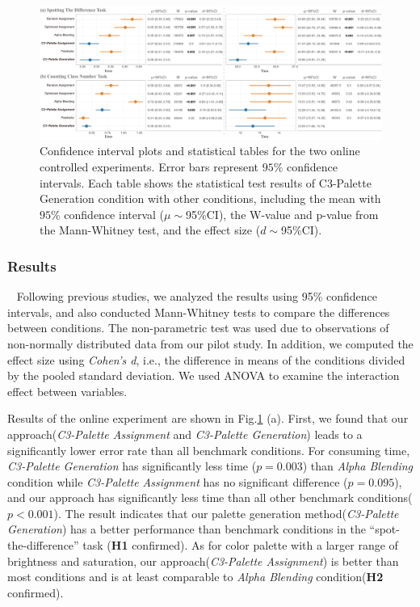 \begin{figure}[t]
\centering
\includegraphics[width=1\linewidth]{figures/user-result-formal.pdf}
\caption{Confidence interval plots and statistical tables for the two online controlled experiments. Error bars represent $95\%$ confidence intervals. Each table shows the statistical test results of C3-Palette Generation condition with other conditions, including the mean with $95\%$ confidence interval ($\mu\sim$95\%CI), the W-value and p-value from the Mann-Whitney test, and the effect size ($d\sim$95\%CI).
}
\vspace*{-3mm}
\label{fig:userResults}
\end{figure}

\subsubsection{Results}
\
\newline
Following previous studies, we analyzed the results using 95\% confidence intervals, and also conducted Mann-Whitney tests to compare the differences between conditions. The non-parametric test was used due to observations of non-normally distributed data from our pilot study. In addition, we computed the effect size using \emph{Cohen's d}, i.e., the difference in means of the conditions divided by the pooled standard deviation. We used ANOVA to examine the interaction effect between variables.


Results of the online experiment are shown in Fig.\ref{fig:userResults} (a).
First, we found that our approach(\emph{C3-Palette Assignment} and \emph{C3-Palette Generation}) leads to a significantly lower error rate than all benchmark conditions. For consuming time, \emph{C3-Palette Generation} has significantly less time (\emph{$p = 0.003$}) than \emph{Alpha Blending} condition while \emph{C3-Palette Assignment} has no significant difference (\emph{$p = 0.095$}), and our approach has significantly less time than all other benchmark conditions(\emph{$p < 0.001$}). The result indicates that our palette generation method(\emph{C3-Palette Generation}) has a better performance than benchmark conditions in the ``spot-the-difference'' task (\textbf{H1} confirmed). As for color palette with a larger range of brightness and saturation, our approach(\emph{C3-Palette Assignment}) is better than most conditions and is at least comparable to \emph{Alpha Blending} condition(\textbf{H2} confirmed).


